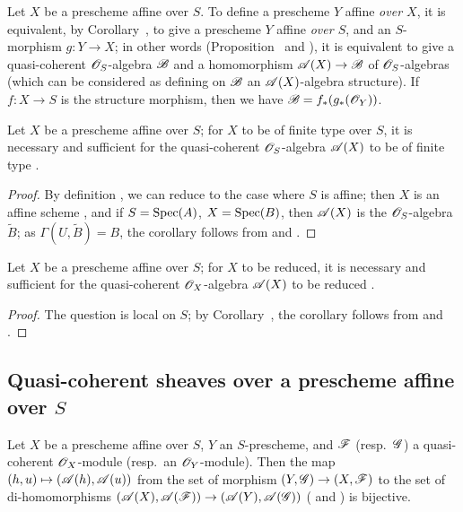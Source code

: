 \begin{env}[1.3.6]
\label{II.1.3.6}
Let $X$ be a prescheme affine over $S$.
To define a prescheme $Y$ affine \emph{over $X$}, it is equivalent, by Corollary~, to give a prescheme $Y$ affine \emph{over $S$}, and an $S$-morphism $g:Y\to X$; in other words (Proposition~ and ), it is equivalent to give a quasi-coherent $\mathscr{O}_S$-algebra $\mathscr{B}$ and a homomorphism $\sh{A}(X)\to\sh{B}$ of $\mathscr{O}_S$-algebras (which can be considered as defining on $\mathscr{B}$ an $\mathscr{A}(X)$-algebra structure).
If $f:X\to S$ is the structure morphism, then we have $\mathscr{B}=f_*(g_*(\mathscr{O}_Y))$.
\end{env}

\begin{corollary}[1.3.7]
\label{II.1.3.7}
Let $X$ be a prescheme affine over $S$; for $X$ to be of finite type over $S$, it is necessary and sufficient for the quasi-coherent $\mathscr{O}_S$-algebra $\mathscr{A}(X)$ to be of finite type .
\end{corollary}

\begin{proof}
By definition , we can reduce to the case where $S$ is affine; then $X$ is an affine scheme , and if $S=\operatorname{Spec}(A)$, $X=\operatorname{Spec}(B)$, then $\mathscr{A}(X)$ is the $\mathscr{O}_S$-algebra $\widetilde{B}$; as $\Gamma(U,\widetilde{B})=B$, the corollary follows from  and .
\end{proof}

\begin{corollary}[1.3.8]
\label{II.1.3.8}
Let $X$ be a prescheme affine over $S$; for $X$ to be reduced, it is necessary and sufficient for the quasi-coherent $\mathscr{O}_X$-algebra $\mathscr{A}(X)$ to be reduced .
\end{corollary}

\begin{proof}
The question is local on $S$; by Corollary~, the corollary follows from  and .
\end{proof}

\subsection{Quasi-coherent sheaves over a prescheme affine over $S$}
\label{subsection:II.1.4}

\begin{proposition}[1.4.1]
\label{II.1.4.1}
Let $X$ be a prescheme affine over $S$, $Y$ an $S$-prescheme, and $\mathscr{F}$ (resp.~$\mathscr{G}$) a quasi-coherent $\mathscr{O}_X$-module (resp.~an $\mathscr{O}_Y$-module).
Then the map $(h,u)\mapsto(\sh{A}(h),\sh{A}(u))$ from the set of morphism $(Y,\sh{G})\to(X,\sh{F})$ to the set of di-homomorphisms $(\sh{A}(X),\sh{A}(\sh{F}))\to(\sh{A}(Y),\sh{A}(\sh{G}))$ ( and ) is bijective.
\end{proposition}

